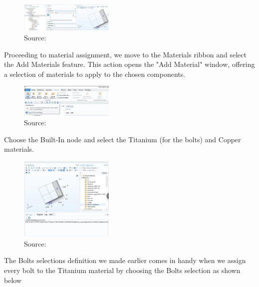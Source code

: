 \begin{figure}[ht!]
  \centering
  \includegraphics[width=0.4\textwidth]{Chapters/Figures/Chapter 3 Figures/Bolts Selection.png}
  \caption{ Source: \cite{}}
  \label{}
\end{figure}

Proceeding to material assignment, we move to the Materials ribbon and select the Add Materials feature. This action opens the "Add Material" window, offering a selection of materials to apply to the chosen components.


\begin{figure}[ht!]
  \centering
  \includegraphics[width=0.4\textwidth]{Chapters/Figures/Chapter 3 Figures/Add Material Button.png}
  \caption{Source: \cite{}}
  \label{}
\end{figure}

Choose the Built-In node and select the Titanium (for the bolts) and Copper materials.

\begin{figure}[ht!]
  \centering
  \includegraphics[width=0.4\textwidth]{Chapters/Figures/Chapter 3 Figures/Add Material Window.png}
  \caption{Source: \cite{}}
  \label{}
\end{figure}

The Bolts selections definition we made earlier comes in handy when we assign every bolt to the Titanium material by choosing the Bolts selection as shown below


